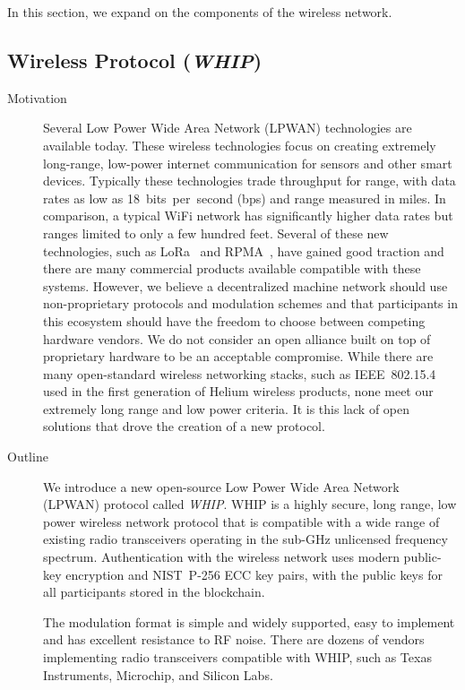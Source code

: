 \documentclass[UTF8, 10pt, nonatbib, nocopyrightspace, reprint]{sigplanconf}
\begin{document}
In this section, we expand on the components of the wireless network.

\subsection{Wireless Protocol (\emph{WHIP})}\label{whip}

\begin{description}
    \item [Motivation] Several Low Power Wide Area Network (LPWAN) technologies are available today. These wireless technologies focus on creating extremely long-range, low-power internet communication for sensors and other smart devices. Typically these technologies trade throughput for range, with data rates as low as 18~bits~per~second (bps) and range measured in miles. In comparison, a typical WiFi network has significantly higher data rates but ranges limited to only a few hundred feet. Several of these new technologies, such as LoRa~\cite{lora} and RPMA~\cite{rpma}, have gained good traction and there are many commercial products available compatible with these systems. However, we believe a decentralized machine network should use non-proprietary protocols and modulation schemes and that participants in this ecosystem should have the freedom to choose between competing hardware vendors. We do not consider an open alliance built on top of proprietary hardware to be an acceptable compromise. While there are many open-standard wireless networking stacks, such as IEEE~802.15.4~\cite{ieee802_15_4} used in the first generation of Helium wireless products, none meet our extremely long range and low power criteria. It is this lack of open solutions that drove the creation of a new protocol.

    \item [Outline] We introduce a new open-source Low Power Wide Area Network (LPWAN) protocol called \emph{WHIP}. WHIP is a highly secure, long range, low power wireless network protocol that is compatible with a wide range of existing radio transceivers operating in the sub-GHz unlicensed frequency spectrum. Authentication with the wireless network uses modern public-key encryption and NIST~P-256 ECC key pairs, with the public keys for all participants stored in the blockchain.

    The modulation format is simple and widely supported, easy to implement and has excellent resistance to RF noise. There are dozens of vendors implementing radio transceivers compatible with WHIP, such as Texas Instruments, Microchip, and Silicon Labs.


\end{description}
\end{document}
